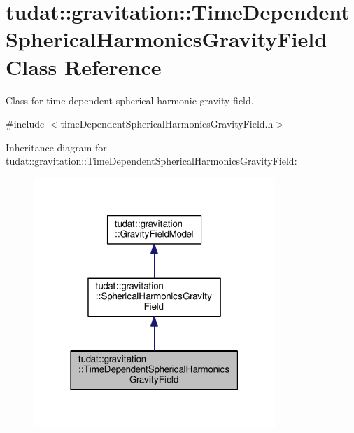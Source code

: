 \hypertarget{classtudat_1_1gravitation_1_1TimeDependentSphericalHarmonicsGravityField}{}\section{tudat\+:\+:gravitation\+:\+:Time\+Dependent\+Spherical\+Harmonics\+Gravity\+Field Class Reference}
\label{classtudat_1_1gravitation_1_1TimeDependentSphericalHarmonicsGravityField}


Class for time dependent spherical harmonic gravity field.  




{\ttfamily \#include $<$time\+Dependent\+Spherical\+Harmonics\+Gravity\+Field.\+h$>$}



Inheritance diagram for tudat\+:\+:gravitation\+:\+:Time\+Dependent\+Spherical\+Harmonics\+Gravity\+Field\+:
\nopagebreak
\begin{figure}[H]
\begin{center}
\leavevmode
\includegraphics[width=259pt]{classtudat_1_1gravitation_1_1TimeDependentSphericalHarmonicsGravityField__inherit__graph}
\end{center}
\end{figure}


